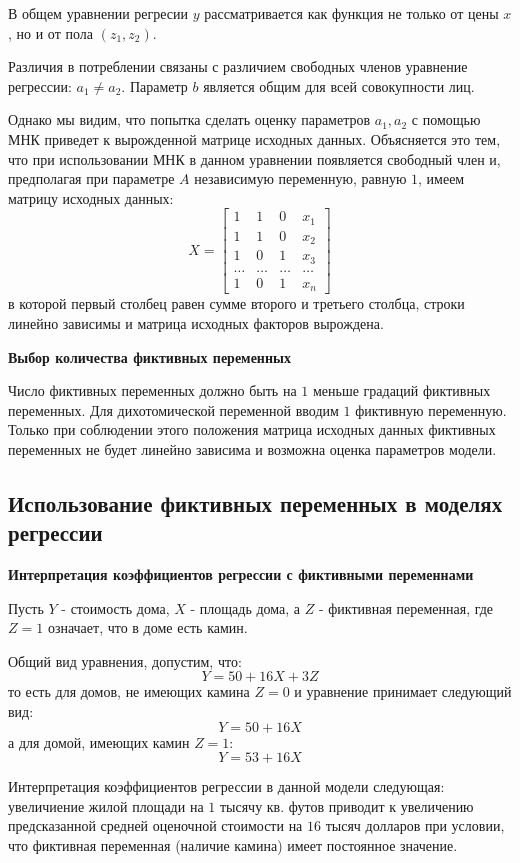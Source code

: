 \documentclass[aps,%
12pt,%
final,%
oneside,
onecolumn,%
musixtex, %
superscriptaddress,%
centertags]{article} %
\theoremstyle{plain}
\theoremstyle{definition}
\theoremstyle{remark}
\begin{document}
В общем уравнении регресии $y$ рассматривается как функция не только от цены $x$, но и от пола $(z_1,z_2)$.

Различия в потреблении связаны с различием свободных членов уравнение регрессии: $a_1 \neq a_2$. Параметр $b$ является общим для всей совокупности лиц.

Однако мы видим, что попытка сделать оценку параметров $a_1,a_2$ с помощью МНК приведет к вырожденной матрице исходных данных. Объясняется это тем, что при использовании МНК в данном уравнении появляется свободный член и, предполагая при параметре $A$ независимую переменную, равную $1$, имеем матрицу исходных данных:
$$X = \begin{bmatrix}
	1 & 1 & 0 & x_1 \\
	1 & 1 & 0 & x_2 \\
	1 & 0 & 1 & x_3 \\
	\ldots & \ldots & \ldots & \ldots \\
	1 & 0 & 1 & x_n
\end{bmatrix}$$
в которой первый столбец равен сумме второго и третьего столбца, строки линейно зависимы и матрица исходных факторов вырождена. 

\textbf{Выбор количества фиктивных переменных}

Число фиктивных переменных должно быть на $1$ меньше градаций фиктивных переменных. Для дихотомической переменной вводим $1$ фиктивную переменную. Только при соблюдении этого положения матрица исходных данных фиктивных переменных не будет линейно зависима и возможна оценка параметров модели.

\subsection{Использование фиктивных переменных в моделях регрессии}

\textbf{Интерпретация коэффициентов регрессии с фиктивными переменнами}

Пусть $Y$ - стоимость дома, $X$ - площадь дома, а $Z$ - фиктивная переменная, где $Z=1$ означает, что в доме есть камин.

Общий вид уравнения, допустим, что:
$$Y = 50 + 16X + 3Z$$
то есть для домов, не имеющих камина $Z=0$ и уравнение принимает следующий вид:
$$Y = 50 + 16X$$
а для домой, имеющих камин $Z=1$:
$$Y = 53 + 16X$$

Интерпретация коэффициентов регрессии в данной модели следующая: увеличиение жилой площади на $1$ тысячу кв. футов приводит к увеличению предсказанной средней оценочной стоимости на $16$ тысяч долларов при условии, что фиктивная переменная (наличие камина) имеет постоянное значение.
\end{document}
